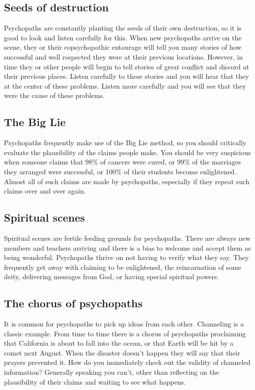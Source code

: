 \documentclass[a5paper,10pt,english]{book}
\begin{document}
\subsection{Seeds of destruction}
\label{\detokenize{psychopaths:seeds-of-destruction}}
\sphinxAtStartPar
Psychopaths are constantly planting the seeds of their own destruction,
so it is good to look and listen carefully for this. When new
psychopaths arrive on the scene, they or their co\sphinxhyphen{}psychopathic entourage
will tell you many stories of how successful and well respected they
were at their previous locations. However, in time they or other people
will begin to tell stories of great conflict and discord at their
previous places. Listen carefully to these stories and you will hear
that they  at the center of these problems. Listen more
carefully and you will see that they were the cause of these problems.


\subsection{The Big Lie}
\label{\detokenize{psychopaths:the-big-lie}}
\sphinxAtStartPar
Psychopaths frequently make use of the Big Lie method, so you should
critically evaluate the plausibility of the claims people make. You
should be very suspicious when someone claims that 98\% of cancers were
cured, or 99\% of the marriages they arranged were successful, or 100\% of
their students become enlightened. Almost all of such claims are made by
psychopaths, especially if they repeat such claims over and over again.


\subsection{Spiritual scenes}
\label{\detokenize{psychopaths:spiritual-scenes}}
\sphinxAtStartPar
Spiritual scenes are fertile feeding grounds for psychopaths. There are
always new members and teachers arriving and there is a bias to welcome
and accept them as being wonderful. Psychopaths thrive on not having to
verify what they say. They frequently get away with claiming to be
enlightened, the reincarnation of some deity, delivering messages from
God, or having special spiritual powers.


\subsection{The chorus of psychopaths}
\label{\detokenize{psychopaths:the-chorus-of-psychopaths}}
\sphinxAtStartPar
It is common for psychopaths to pick up ideas from each other.
Channeling is a classic example. From time to time there is a chorus of
psychopaths proclaiming that California is about to fall into the ocean,
or that Earth will be hit by a comet next August. When the disaster
doesn’t happen they will say that their prayers prevented it. How do you
immediately check out the validity of channeled information? Generally
speaking you can’t, other than reflecting on the plausibility of their
claims and waiting to see what happens.
\end{document}
